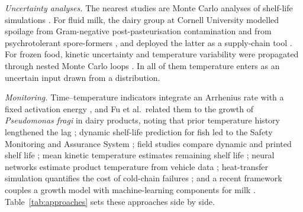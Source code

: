 \textit{Uncertainty analyses.} The nearest studies are Monte Carlo analyses of shelf-life simulations \cite{nauta2000}. For fluid milk, the dairy group at Cornell University modelled spoilage from Gram-negative post-pasteurisation contamination \cite{lau2022} and from psychrotolerant spore-formers \cite{buehler2018}, and deployed the latter as a supply-chain tool \cite{qian2023}. For frozen food, kinetic uncertainty and temperature variability were propagated through nested Monte Carlo loops \cite{giannakourou2020}. In all of them temperature enters as an uncertain input drawn from a distribution.

\textit{Monitoring.} Time--temperature indicators integrate an Arrhenius rate with a fixed activation energy \cite{taoukis1989}, and Fu et al.\ related them to the growth of \textit{Pseudomonas fragi} in dairy products, noting that prior temperature history lengthened the lag \cite{fu1991}; dynamic shelf-life prediction for fish \cite{koutsoumanis2001} led to the Safety Monitoring and Assurance System \cite{koutsoumanis2005}; field studies compare dynamic and printed shelf life \cite{goransson2018}; mean kinetic temperature estimates remaining shelf life \cite{kim2020}; neural networks estimate product temperature from vehicle data \cite{zou2023}; heat-transfer simulation quantifies the cost of cold-chain failures \cite{muller2026,ndraha2018}; and a recent framework couples a growth model with machine-learning components for milk \cite{sofat2026}. Table~\ref{tab:approaches} sets these approaches side by side.

